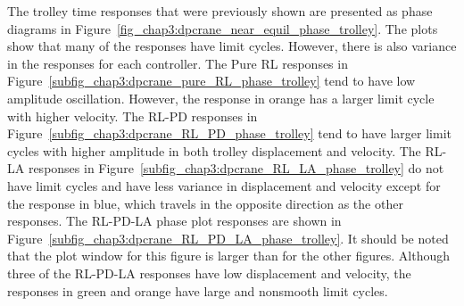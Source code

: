 The trolley time responses that were previously shown are presented as phase diagrams in Figure~\ref{fig_chap3:dpcrane_near_equil_phase_trolley}. The plots show that many of the responses have limit cycles. However, there is also variance in the responses for each controller. The Pure RL responses in Figure~\ref{subfig_chap3:dpcrane_pure_RL_phase_trolley} tend to have low amplitude oscillation. However, the response in orange has a larger limit cycle with higher velocity. The RL-PD responses in Figure~\ref{subfig_chap3:dpcrane_RL_PD_phase_trolley} tend to have larger limit cycles with higher amplitude in both trolley displacement and velocity. The RL-LA responses in Figure~\ref{subfig_chap3:dpcrane_RL_LA_phase_trolley} do not have limit cycles and have less variance in displacement and velocity except for the response in blue, which travels in the opposite direction as the other responses. The RL-PD-LA phase plot responses are shown in Figure~\ref{subfig_chap3:dpcrane_RL_PD_LA_phase_trolley}. It should be noted that the plot window for this figure is larger than for the other figures. Although three of the RL-PD-LA responses have low displacement and velocity, the responses in green and orange have large and nonsmooth limit cycles.
%
